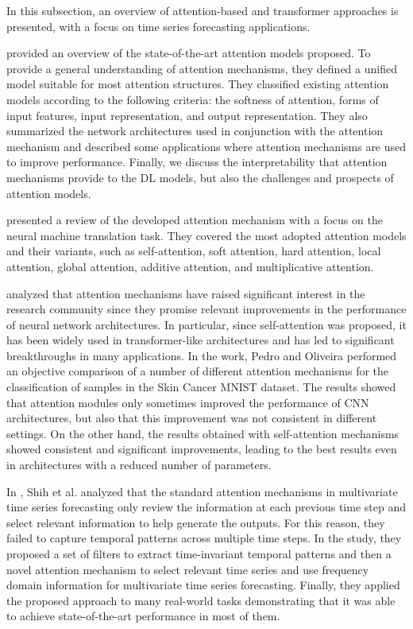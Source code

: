 In this subsection, an overview of attention-based and transformer approaches is presented, with a focus on time series forecasting applications.

\cite{NIU202148} provided an overview of the state-of-the-art attention models proposed.
To provide a general understanding of attention mechanisms, they defined a unified model suitable for most attention structures.
They classified existing attention models according to the following criteria: the softness of attention, forms of input features, input representation, and output representation.
They also summarized the network architectures used in conjunction with the attention mechanism and described some applications where attention mechanisms are used to improve performance.
Finally, we discuss the interpretability that attention mechanisms provide to the DL models, but also the challenges and prospects of attention models.

\cite{9586824} presented a review of the developed attention mechanism with a focus on the neural machine translation task.
They covered the most adopted attention models and their variants, such as self-attention, soft attention, hard attention, local attention, global attention, additive attention, and multiplicative attention.

\cite{9892274} analyzed that attention mechanisms have raised significant interest in the research community since they promise relevant improvements in the performance of neural network architectures.
In particular, since self-attention was proposed, it has been widely used in transformer-like architectures and has led to significant breakthroughs in many applications.
In the work, Pedro and Oliveira performed an objective comparison of a number of different attention mechanisms for the classification of samples in the Skin Cancer MNIST dataset.
The results showed that attention modules only sometimes improved the performance of CNN architectures, but also that this improvement was not consistent in different settings.
On the other hand, the results obtained with self-attention mechanisms showed consistent and significant improvements, leading to the best results even in architectures with a reduced number of parameters.

In \cite{Shih2019}, Shih et al. analyzed that the standard attention mechanisms in multivariate time series forecasting only review the information at each previous time step and select relevant information to help generate the outputs.
For this reason, they failed to capture temporal patterns across multiple time steps.
In the study, they proposed a set of filters to extract time-invariant temporal patterns and then a novel attention mechanism to select relevant time series and use frequency domain information for multivariate time series forecasting.
Finally, they applied the proposed approach to many real-world tasks demonstrating that it was able to achieve state-of-the-art performance in most of them.

